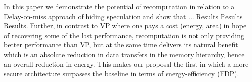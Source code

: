 In this paper we demonstrate the potential of recomputation in relation to a Delay-on-miss approach of hiding speculation and show that ... Results Results Results. Further, {\color{red} in contrast to VP where one pays a cost (energy, area) in hope of recovering some of the lost performance, recomputation is not only providing better performance than VP, but at the same time delivers its natural benefit which is an absolute reduction in data transfers in the memory hierarchy, hence an overall reduction in energy. This makes our proposal the first in which a more secure architecture surpasses the baseline in terms of energy-efficiency (EDP).}





